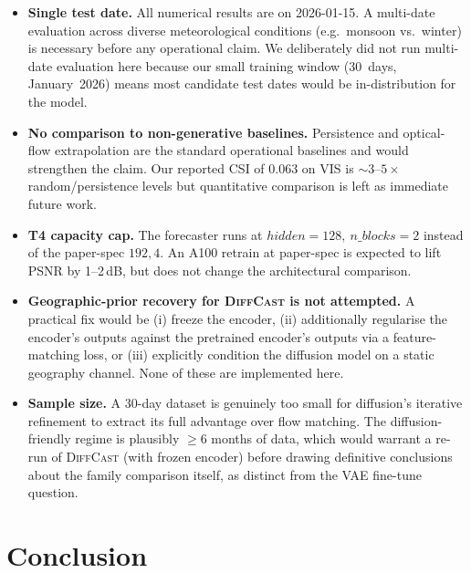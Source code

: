 \documentclass[11pt,a4paper]{article}
\begin{document}
\begin{itemize}[leftmargin=*]
\item \textbf{Single test date.} All numerical results are on 2026-01-15.
      A multi-date evaluation across diverse meteorological conditions
      (e.g.\ monsoon vs.\ winter) is necessary before any operational
      claim. We deliberately did not run multi-date evaluation here
      because our small training window (30~days, January~2026) means most
      candidate test dates would be in-distribution for the model.
\item \textbf{No comparison to non-generative baselines.} Persistence and
      optical-flow extrapolation are the standard operational baselines
      and would strengthen the claim. Our reported CSI of 0.063 on VIS is
      $\sim 3$--$5\times$ random/persistence levels but quantitative
      comparison is left as immediate future work.
\item \textbf{T4 capacity cap.} The forecaster runs at $\mathit{hidden}=128,\
      n\_blocks=2$ instead of the paper-spec $192, 4$. An A100 retrain at
      paper-spec is expected to lift PSNR by 1--2\,dB, but does not change
      the architectural comparison.
\item \textbf{Geographic-prior recovery for \textsc{DiffCast} is not
      attempted.} A practical fix would be (i) freeze the encoder, (ii)
      additionally regularise the encoder's outputs against the pretrained
      encoder's outputs via a feature-matching loss, or (iii) explicitly
      condition the diffusion model on a static geography channel. None of
      these are implemented here.
\item \textbf{Sample size.} A 30-day dataset is genuinely too small for
      diffusion's iterative refinement to extract its full advantage over
      flow matching. The diffusion-friendly regime is plausibly $\geq 6$
      months of data, which would warrant a re-run of \textsc{DiffCast}
      (with frozen encoder) before drawing definitive conclusions about
      the family comparison itself, as distinct from the {VAE} fine-tune
      question.
\end{itemize}

\section{Conclusion}
\label{sec:conclusion}
\end{document}
